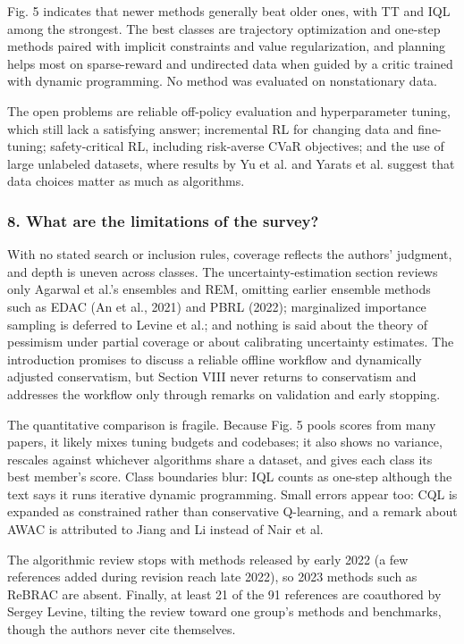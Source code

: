 \documentclass[11pt]{article}
\newcommand{\question}[1]{\subsubsection*{#1}}
\begin{document}
Fig. 5 indicates that newer methods generally beat older ones, with TT and IQL among the strongest. The best classes are trajectory optimization and one-step methods paired with implicit constraints and value regularization, and planning helps most on sparse-reward and undirected data when guided by a critic trained with dynamic programming. No method was evaluated on nonstationary data.

The open problems are reliable off-policy evaluation and hyperparameter tuning, which still lack a satisfying answer; incremental RL for changing data and fine-tuning; safety-critical RL, including risk-averse CVaR objectives; and the use of large unlabeled datasets, where results by Yu et al. and Yarats et al. suggest that data choices matter as much as algorithms.

\question{8. What are the limitations of the survey?}

With no stated search or inclusion rules, coverage reflects the authors' judgment, and depth is uneven across classes. The uncertainty-estimation section reviews only Agarwal et al.'s ensembles and REM, omitting earlier ensemble methods such as EDAC (An et al., 2021) and PBRL (2022); marginalized importance sampling is deferred to Levine et al.; and nothing is said about the theory of pessimism under partial coverage or about calibrating uncertainty estimates. The introduction promises to discuss a reliable offline workflow and dynamically adjusted conservatism, but Section VIII never returns to conservatism and addresses the workflow only through remarks on validation and early stopping.

The quantitative comparison is fragile. Because Fig. 5 pools scores from many papers, it likely mixes tuning budgets and codebases; it also shows no variance, rescales against whichever algorithms share a dataset, and gives each class its best member's score. Class boundaries blur: IQL counts as one-step although the text says it runs iterative dynamic programming. Small errors appear too: CQL is expanded as constrained rather than conservative Q-learning, and a remark about AWAC is attributed to Jiang and Li instead of Nair et al.

The algorithmic review stops with methods released by early 2022 (a few references added during revision reach late 2022), so 2023 methods such as ReBRAC are absent. Finally, at least 21 of the 91 references are coauthored by Sergey Levine, tilting the review toward one group's methods and benchmarks, though the authors never cite themselves.
\end{document}
